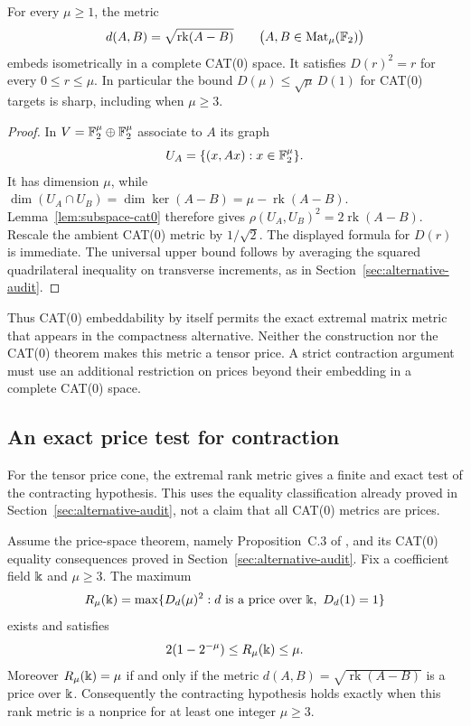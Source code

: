 \begin{proposition}
\label{prop:cat0-matrix-extremizer}
For every $\mu\ge1$, the metric
\[
 d(A,B)=\sqrt{\operatorname{rk}(A-B)}
       \qquad\bigl(A,B\in\operatorname{Mat}_{\mu}(\mathbb F_2)\bigr)
\]
embeds isometrically in a complete CAT(0) space.
It satisfies $D(r)^2=r$ for every $0\le r\le\mu$.
In particular the bound $D(\mu)\le\sqrt\mu\,D(1)$ for CAT(0)
targets is sharp, including when $\mu\ge3$.
\end{proposition}

\begin{proof}
In $V=\mathbb F_2^\mu\oplus\mathbb F_2^\mu$ associate to $A$ its graph
\[
 U_A=\{(x,Ax):x\in\mathbb F_2^\mu\}.
\]
It has dimension $\mu$, while
$\dim(U_A\cap U_B)=\dim\ker(A-B)=\mu-\operatorname{rk}(A-B)$.
Lemma~\ref{lem:subspace-cat0} therefore gives
$\rho(U_A,U_B)^2=2\operatorname{rk}(A-B)$.
Rescale the ambient CAT(0) metric by $1/\sqrt2$.
The displayed formula for $D(r)$ is immediate.
The universal upper bound follows by averaging the squared
quadrilateral inequality on transverse increments, as in
Section~\ref{sec:alternative-audit}.
\end{proof}

Thus CAT(0) embeddability by itself permits the exact extremal
matrix metric that appears in the compactness alternative.
Neither the construction nor the CAT(0) theorem makes this metric
a tensor price. A strict contraction argument must use an
additional restriction on prices beyond their embedding in a
complete CAT(0) space.

\subsection{An exact price test for contraction}

For the tensor price cone, the extremal rank metric gives a finite
and exact test of the contracting hypothesis. This uses the equality
classification already proved in Section~\ref{sec:alternative-audit},
not a claim that all CAT(0) metrics are prices.

\begin{proposition}
\label{prop:rank-price-contraction-gate}
Assume the price-space theorem, namely Proposition~C.3 of
\cite{Anthropic2026}, and its CAT(0) equality consequences proved in
Section~\ref{sec:alternative-audit}.
Fix a coefficient field $\Bbbk$ and $\mu\ge3$. The maximum
\[
 R_\mu(\Bbbk)=
 \max\{D_d(\mu)^2:d\text{ is a price over }\Bbbk,\ D_d(1)=1\}
\]
exists and satisfies
\[
 2(1-2^{-\mu})\le R_\mu(\Bbbk)\le\mu.
\]
Moreover $R_\mu(\Bbbk)=\mu$ if and only if the metric
$d(A,B)=\sqrt{\operatorname{rk}(A-B)}$ is a price over $\Bbbk$.
Consequently the contracting hypothesis holds exactly when this
rank metric is a nonprice for at least one integer $\mu\ge3$.
\end{proposition}

